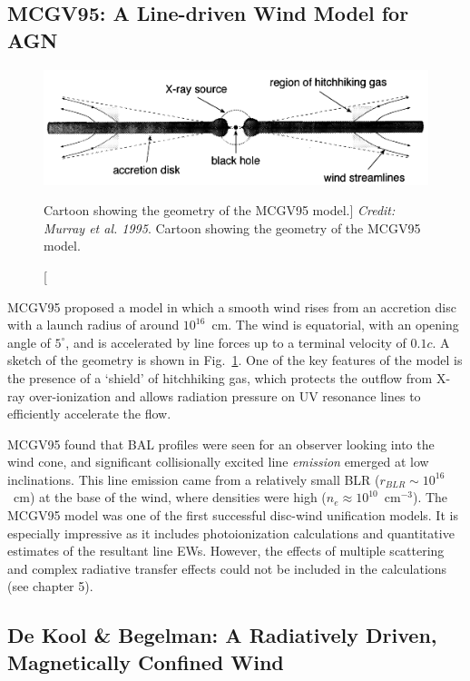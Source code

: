 \subsection{MCGV95: A Line-driven Wind Model for AGN}

\begin{figure}
\centering
\includegraphics[width=1.0\textwidth]{figures/02-outflows/MCGV95.png}
\caption
[Cartoon showing the geometry of the MCGV95 model.]
{
{\sl Credit: Murray et al. 1995}. 
Cartoon showing the geometry of the MCGV95 model.
} 
\label{fig:MCGV95}
\end{figure}

MCGV95 proposed a model in which a smooth wind rises from an accretion disc with a launch
radius of around $10^{16}$~cm. The wind is equatorial, with an opening angle
of $5^\circ$, and is accelerated by line forces up to a terminal velocity of $0.1c$.
A sketch of the geometry is shown in Fig.~\ref{fig:MCGV95}.
One of the key features of the model is the presence of a `shield' of hitchhiking
gas, which protects the outflow from X-ray over-ionization 
and allows radiation pressure on UV resonance lines to efficiently 
accelerate the flow. 

MCGV95 found that BAL profiles were
seen for an observer looking into the wind cone, and significant collisionally excited
line {\em emission} emerged at low inclinations. This line emission came
from a relatively small BLR ($r_{BLR} \sim10^{16}$~cm) at the base of the wind, 
where densities were high ($n_e \approx 10^{10}$~cm$^{-3}$). 
The MCGV95 model was one of the first successful disc-wind unification models.
It is especially impressive as it includes photoionization calculations and 
quantitative estimates of the resultant line EWs. However, the effects of multiple
scattering and complex radiative transfer effects could not be included 
in the calculations (see chapter 5).

\subsection{De Kool \& Begelman: A Radiatively Driven, Magnetically Confined Wind}

